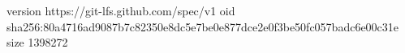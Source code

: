 version https://git-lfs.github.com/spec/v1
oid sha256:80a4716ad9087b7c82350e8dc5e7be0e877dce2e0f3be50fc057badc6e00c31e
size 1398272
